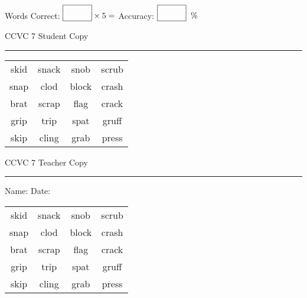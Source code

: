 \documentclass{memoir}
\begin{document}
\small

Words Correct: $\fbox{\phantom{\huge 100}} \times 5 = $ Accuracy: $\fbox{\phantom{\huge 100}}\;\; \%$ 

\vfill

\newpage


\footnotesize \noindent
CCVC 7 \hfill Student Copy
\smallskip
\hrule

\Large

\setlength{\tabcolsep}{14pt}
\def\arraystretch{3}

{\selectfont


\begin{vplace}[0.5]
\begin{center}
\begin{tabular}{cccc}
skid & snack & snob & scrub \\
snap & clod & block & crash \\
brat               & scrap & flag             & crack       \\
grip      & trip & spat            & gruff \\
skip & cling & grab                    & press       \\
\end{tabular}
\end{center}
\end{vplace}

}

\newpage

\footnotesize \noindent
CCVC 7 \hfill Teacher Copy
\smallskip
\hrule

\small

\vfill

\noindent
Name: \underline{\hspace{1.75in}} \hfill Date: \underline{\hspace{1in}}

\Large

{\selectfont


\begin{vplace}[0.5]
\begin{center}
\begin{tabular}{cccc}
skid & snack & snob & scrub \\
snap & clod & block & crash \\
brat               & scrap & flag             & crack       \\
grip      & trip & spat            & gruff \\
skip & cling & grab                    & press       \\
\end{tabular}
\end{center}
\end{vplace}



}
\end{document}
